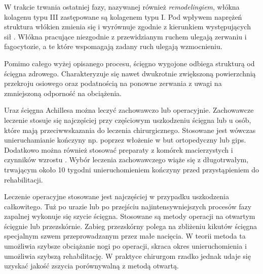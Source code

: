 W trakcie trwania ostatniej fazy, nazywanej również \textit{remodelingiem}, włókna kolagenu typu III zastępowane są kolagenem typu I. Pod wpływem naprężeń struktura włókien zmienia się i wyrównuje zgodnie z kierunkiem występujących sił \cite{Yang2013}. Włókna pracujące niezgodnie z przewidzianym ruchem ulegają zerwaniu i fagocytozie, \linebreak a te które wspomagają zadany ruch ulegają wzmocnieniu. 

Pomimo całego wyżej opisanego procesu, ścięgno wygojone odbiega strukturą od ścięgna zdrowego. Charakteryzuje się nawet dwukrotnie zwiększoną powierzchnią przekroju osiowego oraz podatnością na ponowne zerwania z uwagi na zmniejszoną odporność na obciążenia. 

Uraz ścięgna Achillesa można leczyć zachowawczo lub operacyjnie. Zachowawcze leczenie stosuje się najczęściej przy częściowym uszkodzeniu ścięgna lub u osób, które mają przeciwwskazania do leczenia chirurgicznego. Stosowane jest wówczas unieruchamianie kończyny np. poprzez włożenie w but ortopedyczny lub gips. Dodatkowo można również stosować preparaty z komórek macierzystych i czynników wzrostu \cite{CMC}. Wybór leczenia zachowawczego wiąże się z długotrwałym, trwającym około 10 tygodni unieruchomieniem kończyny przed przystąpieniem do rehabilitacji.

Leczenie operacyjne stosowane jest najczęściej w przypadku uszkodzenia całkowitego. Tuż po urazie lub po przejściu najintensywniejszych procesów fazy zapalnej wykonuje się szycie ścięgna. Stosowane są metody operacji na otwartym ścięgnie lub przezskórnie. Zabieg przezskórny polega na zbliżeniu kikutów ścięgna specjalnym szwem przeprowadzanym przez małe nacięcia. W teorii metoda ta umożliwia szybsze obciążanie nogi po operacji, skraca okres unieruchomienia i umożliwia szybszą rehabilitację. W praktyce chirurgom rzadko jednak udaje się uzyskać jakość zszycia porównywalną z metodą otwartą. 

